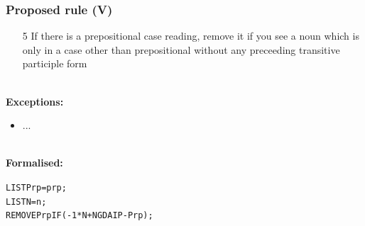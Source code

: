 \documentclass{beamer}
\begin{document}
\begin{frame}
  \frametitle{Proposed rule (V)}

  \begin{itemize}
    \item[5] If there is a prepositional case reading, remove it if you see a
       noun which is only in a case other than prepositional without any preceeding transitive participle form
  \end{itemize}
~\\
\textbf{Exceptions:}
  \begin{itemize}
    \item ...
  \end{itemize}

~\\
\textbf{Formalised:}
{\small
  \begin{alltt}
    LIST Prp = prp ; \\
    LIST N = n ;\\
    REMOVE Prp IF (-1* N + NGDAIP - Prp) ;\\
  \end{alltt}
}

\end{frame}
\end{document}
